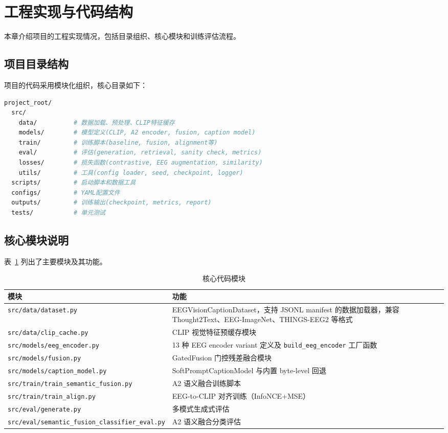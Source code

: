 \section{工程实现与代码结构}

本章介绍项目的工程实现情况，包括目录组织、核心模块和训练评估流程。

\subsection{项目目录结构}

项目的代码采用模块化组织，核心目录如下：

\begin{lstlisting}[language=bash,caption={项目目录结构}]
project_root/
  src/
    data/          # 数据加载、预处理、CLIP特征缓存
    models/        # 模型定义(CLIP, A2 encoder, fusion, caption model)
    train/         # 训练脚本(baseline, fusion, alignment等)
    eval/          # 评估(generation, retrieval, sanity check, metrics)
    losses/        # 损失函数(contrastive, EEG augmentation, similarity)
    utils/         # 工具(config loader, seed, checkpoint, logger)
  scripts/         # 启动脚本和数据工具
  configs/         # YAML配置文件
  outputs/         # 训练输出(checkpoint, metrics, report)
  tests/           # 单元测试
\end{lstlisting}

\subsection{核心模块说明}

表~\ref{tab:code-modules} 列出了主要模块及其功能。

\begin{table}[htbp]
  \centering
  \caption{核心代码模块}
  \label{tab:code-modules}
  \begin{tabularx}{\linewidth}{l X}
    \toprule
    模块 & 功能 \\
    \midrule
    \texttt{src/data/dataset.py} & EEGVisionCaptionDataset，支持 JSONL manifest 的数据加载器，兼容 Thought2Text、EEG-ImageNet、THINGS-EEG2 等格式 \\
    \texttt{src/data/clip\_cache.py} & CLIP 视觉特征预缓存模块 \\
    \texttt{src/models/eeg\_encoder.py} & 13 种 EEG encoder variant 定义及 \texttt{build\_eeg\_encoder} 工厂函数 \\
    \texttt{src/models/fusion.py} & GatedFusion 门控残差融合模块 \\
    \texttt{src/models/caption\_model.py} & SoftPromptCaptionModel 与内置 byte-level 回退 \\
    \texttt{src/train/train\_semantic\_fusion.py} & A2 语义融合训练脚本 \\
    \texttt{src/train/train\_align.py} & EEG-to-CLIP 对齐训练（InfoNCE+MSE）\\
    \texttt{src/eval/generate.py} & 多模式生成式评估 \\
    \texttt{src/eval/semantic\_fusion\_classifier\_eval.py} & A2 语义融合分类评估 \\
    \bottomrule
  \end{tabularx}
\end{table}

